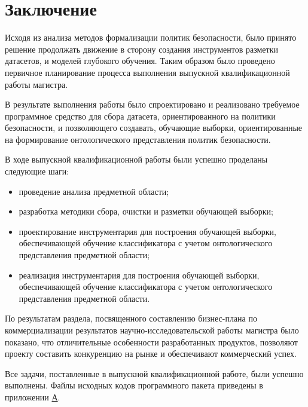 \documentclass[../main]{subfiles}
\begin{document}
\newpage
{}
{}
\section*{Заключение}

Исходя из анализа методов формализации политик безопасности, было принято решение продолжать движение в сторону создания инструментов разметки датасетов, и моделей глубокого обучения. Таким образом было проведено первичное планирование процесса выполнения выпускной квалификационной работы магистра.

В результате выполнения работы было спроектировано и реализовано требуемое программное средство для сбора датасета, ориентированного на политики безопасности, и позволяющего создавать, обучающие выборки, ориентированные на формирование онтологического представления политик безопасности.

В ходе выпускной квалификационной работы были успешно проделаны следующие шаги:
\begin{itemize}
    \item проведение анализа предметной области;
    \item разработка методики сбора, очистки и разметки обучающей выборки;
    \item проектирование инструментария для построения обучающей выборки, обеспечивающей обучение классификатора с учетом онтологического представления предметной области;
    \item реализация инструментария для построения обучающей выборки, обеспечивающей обучение классификатора с учетом онтологического представления предметной области.
\end{itemize}

По результатам раздела, посвященного составлению бизнес-плана по коммерциализации результатов научно-исследовательской работы магистра было показано, что отличительные особенности разработанных продуктов, позволяют проекту составить конкуренцию на рынке и обеспечивают коммерческий успех.

Все задачи, поставленные в выпускной квалификационной работе, были успешно выполнены. Файлы исходных кодов программного пакета приведены в приложении \hyperref[sec:appendix1]{А}.
\end{document}
